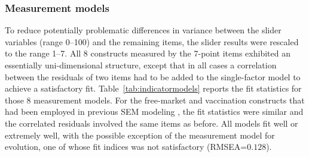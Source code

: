 \documentclass[fignum,man]{apa}\usepackage[]{graphicx}\usepackage[]{color}
\begin{document}
\subsubsection{Measurement models}
To reduce potentially
problematic differences in variance between the slider variables (range 0--100)
and the remaining items, the slider results were rescaled to the range 1--7. 
All 8 constructs measured by the 7-point items 
exhibited an essentially uni-dimensional
structure, except that in all cases a 
correlation between the residuals of two items
had to be
added to the single-factor model to achieve a satisfactory fit.
Table~\ref{tab:indicatormodels} reports the fit statistics for  those 
8 measurement models. For the free-market and vaccination constructs that
had been employed in previous SEM modeling \cite{Lewandowsky13b}, 
the fit statistics were similar and the
correlated residuals involved the same items as before.
All models fit well or extremely well, with the possible 
exception of the measurement model for evolution, one of
whose fit indices was not satisfactory (RMSEA=$0.128$).
\end{document}
